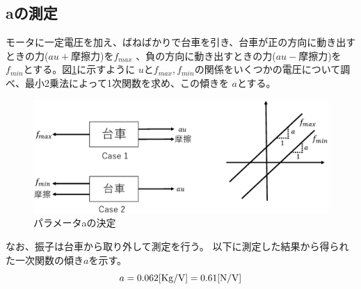 \subsection{aの測定}
	モータに一定電圧を加え、ばねばかりで台車を引き、台車が正の方向に動き出すときの力($au+摩擦力$)を$f_{max}$
	、負の方向に動き出すときの力($au-摩擦力$)を$f_{min}$とする。図\ref{image:parameterA}に示すように
	$u$と$f_{max},f_{min}$の関係をいくつかの電圧について調べ、最小2乗法によって1次関数を求め、この傾きを
	$a$とする\cite{Koga:Binpe}。
	\begin{figure}[H]
		\centering
		\includegraphics[width=1.0\linewidth]{gazo/ParameterA.eps}
		\caption{パラメータaの決定}
		\label{image:parameterA}
	\end{figure}
	なお、振子は台車から取り外して測定を行う。
	以下に測定した結果から得られた一次関数の傾き$a$を示す。
	\[
		a=0.062[\rm{Kg/V}] = 0.61[\rm{N/V}]
	\]
	
